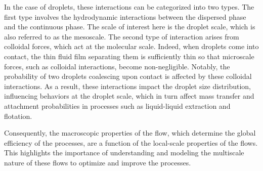 In the case of droplets, these interactions can be categorized into two types. The first type involves the hydrodynamic interactions between the dispersed phase and the continuous phase. 
The scale of interest here is the droplet scale, which is also referred to as the mesoscale. 
The second type of interaction arises from colloidal forces, which act at the molecular scale.
Indeed, when droplets come into contact, the thin fluid film separating them is sufficiently thin so that microscale forces, such as colloidal interactions, become non-negligible. 
Notably, the probability of two droplets coalescing upon contact is affected by these colloidal interactions. 
As a result, these interactions impact the droplet size distribution, influencing behaviors at the droplet scale, which in turn affect mass transfer and attachment probabilities in processes such as liquid-liquid extraction and flotation.

Consequently, the macroscopic properties of the flow, which determine the global efficiency of the processes, are a function of the local-scale properties of the flows.
This highlights the importance of understanding and modeling the multiscale nature of these flows to optimize and improve the processes.

